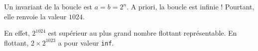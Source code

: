 \question{} Un invariant de la boucle est $a = b = 2^n$. A priori, la boucle est infinie ! Pourtant, elle renvoie la valeur $1024$. 

En effet, $2^{1024}$ est supérieur au plus grand nombre flottant représentable. En flottant, $2 \times 2^{1023}$ a pour valeur \texttt{inf}. 
